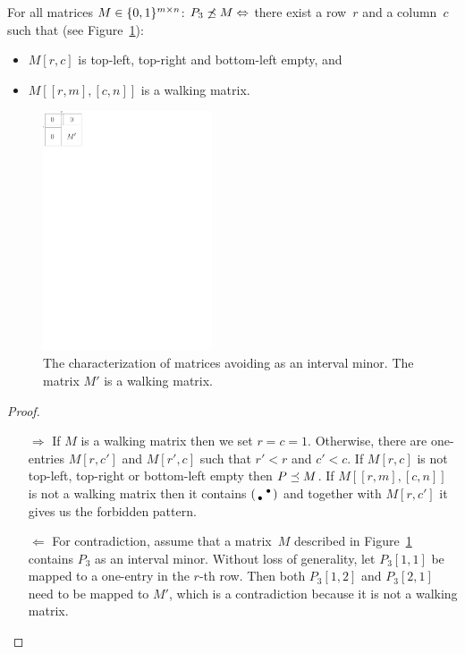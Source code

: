 \begin{prop}
\label{prop:p31}
For all matrices $M\in\{0,1\}^{m\times n}$: $P_3\not\preceq M\Leftrightarrow$ there exist a row~$r$ and a column~$c$ such that (see Figure~\ref{fig:p12}):
\begin{itemize}
\item $M[r,c]$ is top-left, top-right and bottom-left empty, and
\item $M[[r,m],[c,n]]$ is a walking matrix.
\end{itemize}
\end{prop}
\begin{figure}[!ht]
\centering
\includegraphics[width=50mm]{img/p12.pdf}
\caption{The characterization of matrices avoiding \usebox{\smlmat} as an interval minor. The matrix $M'$ is a walking matrix.}
\label{fig:p12}
\end{figure}
\begin{proof}
\begin{itemize}
	\item[$\Rightarrow$] If $M$ is a walking matrix then we set $r=c=1$. Otherwise, there are one-entries $M[r,c']$ and $M[r',c]$ such that $r'<r$ and $c'<c$. If $M[r,c]$ is not top-left, top-right or bottom-left empty then $P\preceq M$. If $M[[r,m],[c,n]]$ is not a walking matrix then it contains $\left(\begin{smallmatrix} &\bullet\\\bullet& \end{smallmatrix}\right)$ and together with $M[r,c']$ it gives us the forbidden pattern.
	\item[$\Leftarrow$] For contradiction, assume that a matrix~$M$ described in Figure~\ref{fig:p12} contains $P_3$ as an interval minor. Without loss of generality, let $P_3[1,1]$ be mapped to a one-entry in the $r$-th row. Then both $P_3[1,2]$ and $P_3[2,1]$ need to be mapped to $M'$, which is a contradiction because it is not a walking matrix. \qedhere
\end{itemize}
\end{proof}

